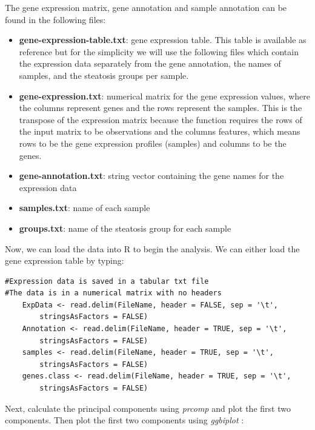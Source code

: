 \documentclass[11pt, oneside]{article}   	%
\begin{document}
The gene expression matrix, gene annotation and sample annotation can be found in the following files:

\begin{itemize}
   \item {\bf gene-expression-table.txt}: gene expression table. This table is available as reference but for the simplicity we will use the following files which contain the expression data separately from the gene annotation, the names of samples, and the steatosis groups per sample.
   \item {\bf gene-expression.txt}: numerical matrix for the gene expression values, where the columns represent genes and the rows represent the samples. This is the transpose of the expression matrix because the function requires the rows of the input matrix to be observations and the columns features, which means rows to be the gene expression profiles (samples) and columns to be the genes.
   \item {\bf gene-annotation.txt}: string vector containing the gene names for the expression data
   \item {\bf samples.txt}: name of each sample
   \item {\bf groups.txt}: name of the steatosis group for each sample
\end{itemize}


Now, we can load the data into R to begin the analysis. We can either load the gene expression table by typing:

\begin{framed}
\begin{verbatim}
#Expression data is saved in a tabular txt file
#The data is in a numerical matrix with no headers
	ExpData <- read.delim(FileName, header = FALSE, sep = '\t', 
		stringsAsFactors = FALSE)
	Annotation <- read.delim(FileName, header = TRUE, sep = '\t', 
		stringsAsFactors = FALSE)
	samples <- read.delim(FileName, header = TRUE, sep = '\t', 
		stringsAsFactors = FALSE)
	genes.class <- read.delim(FileName, header = TRUE, sep = '\t', 
		stringsAsFactors = FALSE)
\end{verbatim}
\end{framed}

Next, calculate the principal components using {\it prcomp} and plot the first two components. Then plot the first two components using {\it ggbiplot} \cite{Vu2016}:    
\end{document}
